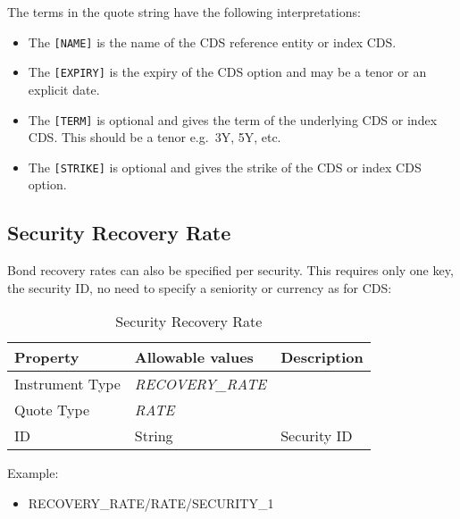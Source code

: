 The terms in the quote string have the following interpretations:
\begin{itemize}
\item The \lstinline![NAME]! is the name of the CDS reference entity or index CDS.
\item The \lstinline![EXPIRY]! is the expiry of the CDS option and may be a tenor or an explicit date.
\item The \lstinline![TERM]! is optional and gives the term of the underlying CDS or index CDS. This should be a tenor e.g.\ 3Y, 5Y, etc.
\item The \lstinline![STRIKE]! is optional and gives the strike of the CDS or index CDS option.
\end{itemize}


\subsection{Security Recovery Rate}\label{md:sec_rec_rates}

Bond recovery rates can also be specified per security. This requires only one key, the security ID, no need to specify a seniority or currency as for CDS:

\begin{table}[H]
\centering
  \begin{tabular}{|p{3cm}|p{3.5cm}|p{7cm}|}
    \hline
    {\bf Property} & {\bf Allowable values} & {\bf Description} \\ \hline
    Instrument Type & \emph{RECOVERY\_RATE} & \\ \hline
    Quote Type & \emph{RATE} & \\ \hline
    ID & String &  Security ID \\ \hline
  \end{tabular}
  \caption{Security Recovery Rate}
  \label{tab:secrecrate_quote}
\end{table}

Example:
\begin{itemize}
\item {RECOVERY\_RATE/RATE/SECURITY\_1}
\end{itemize}


